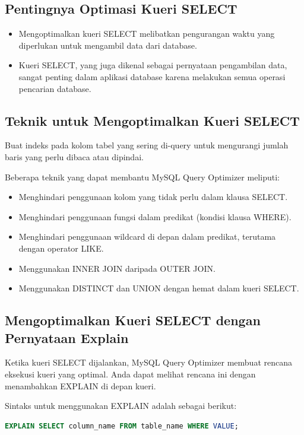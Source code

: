 \documentclass{article}
\begin{document}
\subsection{Pentingnya Optimasi Kueri SELECT}
\begin{itemize}
    \item Mengoptimalkan kueri SELECT melibatkan pengurangan waktu yang diperlukan untuk mengambil data dari database.
    \item Kueri SELECT, yang juga dikenal sebagai pernyataan pengambilan data, sangat penting dalam aplikasi database karena melakukan semua operasi pencarian database.
\end{itemize}

\subsection{Teknik untuk Mengoptimalkan Kueri SELECT}
Buat indeks pada kolom tabel yang sering di-query untuk mengurangi jumlah baris yang perlu dibaca atau dipindai.

Beberapa teknik yang dapat membantu MySQL Query Optimizer meliputi:
\begin{itemize}
    \item Menghindari penggunaan kolom yang tidak perlu dalam klausa SELECT.
    \item Menghindari penggunaan fungsi dalam predikat (kondisi klausa WHERE).
    \item Menghindari penggunaan wildcard di depan dalam predikat, terutama dengan operator LIKE.
    \item Menggunakan INNER JOIN daripada OUTER JOIN.
    \item Menggunakan DISTINCT dan UNION dengan hemat dalam kueri SELECT.
\end{itemize}

\subsection{Mengoptimalkan Kueri SELECT dengan Pernyataan Explain}
Ketika kueri SELECT dijalankan, MySQL Query Optimizer membuat rencana eksekusi kueri yang optimal. Anda dapat melihat rencana ini dengan menambahkan EXPLAIN di depan kueri.

Sintaks untuk menggunakan EXPLAIN adalah sebagai berikut:
\begin{lstlisting}[language=SQL, caption={}, captionpos=b]
EXPLAIN SELECT column_name FROM table_name WHERE VALUE;
\end{lstlisting}
\end{document}
